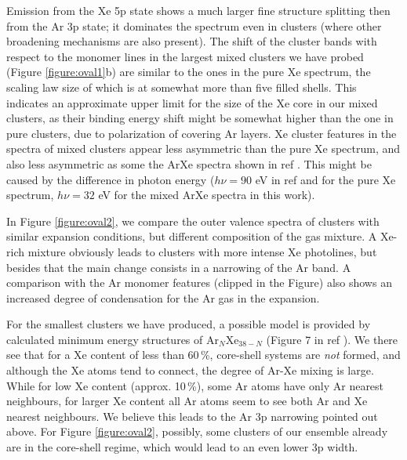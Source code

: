 \documentclass[journal=jpccck,manuscript=article]{achemso}
\begin{document}
Emission from the Xe 5p state shows a much larger fine structure splitting then from the Ar 3p state; it dominates the spectrum even in clusters (where other broadening mechanisms are also present).
The shift of the cluster bands with respect to the monomer lines in the largest mixed clusters we have probed (Figure \ref{figure:oval1}b) are similar to the ones in the pure Xe spectrum, the scaling law size of which is at somewhat more than five filled shells.
This indicates an approximate upper limit for the size of the Xe core in our mixed clusters, as their binding energy shift might be somewhat higher than the one in pure clusters, due to polarization of covering Ar layers.
Xe cluster features in the spectra of mixed clusters appear less asymmetric than the pure Xe spectrum, and also less asymmetric as some the ArXe spectra shown in ref .
This might be caused by the difference in photon energy ($h\nu = 90$ eV in ref  and for the pure Xe spectrum, $h\nu = 32$ eV for the mixed ArXe spectra in this work).


In Figure \ref{figure:oval2}, we compare the outer valence spectra of clusters with similar expansion conditions, but different composition of the gas mixture.
A Xe-rich mixture obviously leads to clusters with more intense Xe photolines, but besides that the main change consists in a narrowing of the Ar band.
A comparison with the Ar monomer features (clipped in the Figure) also shows an increased degree of condensation for the Ar gas in the expansion.

For the smallest clusters we have produced, a possible model is provided by calculated minimum energy structures of Ar$_N$Xe$_{38-N}$ (Figure 7 in ref ).
We there see that for a Xe content of less than 60\,\%, core-shell systems are {\it not} formed, and although the Xe atoms tend to connect, the degree of Ar-Xe mixing is large.
While for low Xe content (approx. 10\,\%), some Ar atoms have only Ar nearest neighbours, for larger Xe content all Ar atoms seem to see both Ar and Xe nearest neighbours.
We believe this leads to the Ar 3p narrowing pointed out above.
For Figure \ref{figure:oval2}, possibly, some clusters of our ensemble already are in the core-shell regime, which would lead to an even lower 3p width.
\end{document}
